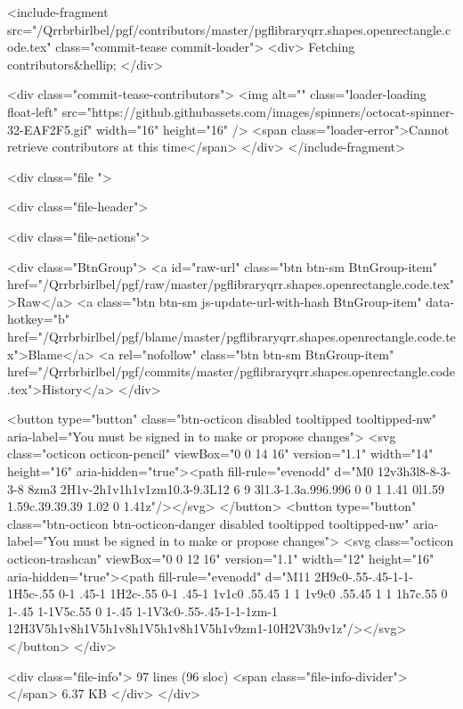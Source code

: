     <include-fragment src="/Qrrbrbirlbel/pgf/contributors/master/pgflibraryqrr.shapes.openrectangle.code.tex" class="commit-tease commit-loader">
      <div>
        Fetching contributors&hellip;
      </div>

      <div class="commit-tease-contributors">
          <img alt="" class="loader-loading float-left" src="https://github.githubassets.com/images/spinners/octocat-spinner-32-EAF2F5.gif" width="16" height="16" />
        <span class="loader-error">Cannot retrieve contributors at this time</span>
      </div>
</include-fragment>


    <div class="file ">
      
<div class="file-header">

  <div class="file-actions">


    <div class="BtnGroup">
      <a id="raw-url" class="btn btn-sm BtnGroup-item" href="/Qrrbrbirlbel/pgf/raw/master/pgflibraryqrr.shapes.openrectangle.code.tex">Raw</a>
        <a class="btn btn-sm js-update-url-with-hash BtnGroup-item" data-hotkey="b" href="/Qrrbrbirlbel/pgf/blame/master/pgflibraryqrr.shapes.openrectangle.code.tex">Blame</a>
      <a rel="nofollow" class="btn btn-sm BtnGroup-item" href="/Qrrbrbirlbel/pgf/commits/master/pgflibraryqrr.shapes.openrectangle.code.tex">History</a>
    </div>


        <button type="button" class="btn-octicon disabled tooltipped tooltipped-nw"
          aria-label="You must be signed in to make or propose changes">
          <svg class="octicon octicon-pencil" viewBox="0 0 14 16" version="1.1" width="14" height="16" aria-hidden="true"><path fill-rule="evenodd" d="M0 12v3h3l8-8-3-3-8 8zm3 2H1v-2h1v1h1v1zm10.3-9.3L12 6 9 3l1.3-1.3a.996.996 0 0 1 1.41 0l1.59 1.59c.39.39.39 1.02 0 1.41z"/></svg>
        </button>
        <button type="button" class="btn-octicon btn-octicon-danger disabled tooltipped tooltipped-nw"
          aria-label="You must be signed in to make or propose changes">
          <svg class="octicon octicon-trashcan" viewBox="0 0 12 16" version="1.1" width="12" height="16" aria-hidden="true"><path fill-rule="evenodd" d="M11 2H9c0-.55-.45-1-1-1H5c-.55 0-1 .45-1 1H2c-.55 0-1 .45-1 1v1c0 .55.45 1 1 1v9c0 .55.45 1 1 1h7c.55 0 1-.45 1-1V5c.55 0 1-.45 1-1V3c0-.55-.45-1-1-1zm-1 12H3V5h1v8h1V5h1v8h1V5h1v8h1V5h1v9zm1-10H2V3h9v1z"/></svg>
        </button>
  </div>

  <div class="file-info">
      97 lines (96 sloc)
      <span class="file-info-divider"></span>
    6.37 KB
  </div>
</div>

